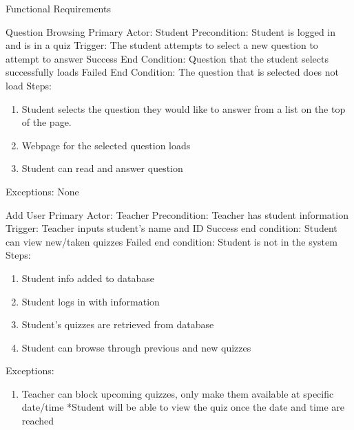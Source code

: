 \documentclass{article}
\begin{document}
\begin{section}{Functional Requirements}
    \begin{subsection}{Question Browsing}
    Primary Actor: Student \newline
    Precondition: Student is logged in and is in a quiz         \newline
    Trigger: The student attempts to select a new question      to attempt to answer \newline
    Success End Condition: Question that the student selects     successfully loads \newline
    Failed End Condition: The question that is selected does     not load \newline
    \newline
    Steps:
    \begin{enumerate}
    \item{Student selects the question they would like to        answer from a list on the top of the page.}
    \item{Webpage for the selected question loads}
    \item{Student can read and answer question}
    \end{enumerate}
    Exceptions: None
    \end{subsection}
    
    \begin{subsection}{Add User}
    Primary Actor: Teacher \newline
    Precondition: Teacher has student information \newline
    Trigger: Teacher inputs student’s name and ID \newline
    Success end condition: Student can view new/taken           quizzes \newline
    Failed end condition: Student is not in the system          \newline
    \newline
    Steps:
    \begin{enumerate}
    \item{Student info added to database}
    \item{Student logs in with information}
    \item{Student’s quizzes are retrieved from database}
    \item{Student can browse through previous and new               quizzes}
    \end{enumerate}
    Exceptions:
    \begin{enumerate}
    \addtocounter{enumi}{3}
    \item{Teacher can block upcoming quizzes, only make them         available at specific date/time \newline
	    *Student will be able to view the quiz once the date         and time are reached}
    \end{enumerate}
    \end{subsection}

\end{section}
\end{document}
